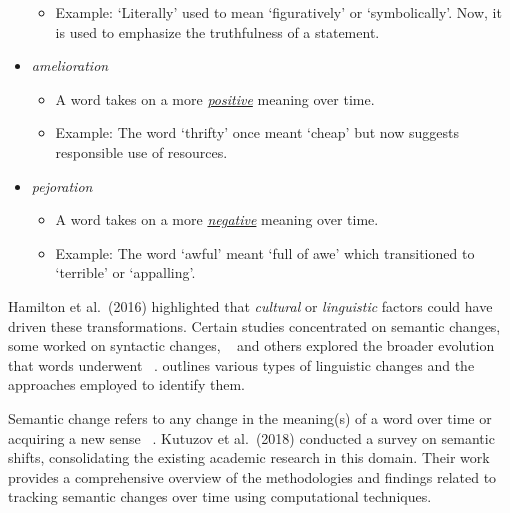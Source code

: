 \begin{itemize}
\begin{itemize}
            \item Example: `Literally' used to mean `figuratively' or `symbolically'.
            Now, it is used to emphasize the truthfulness of a statement.
        \end{itemize}
    \item \emph{amelioration}
     \begin{itemize}
            \item A word takes on a more \underline{\emph{positive}} meaning over time.
            \item Example: The word `thrifty' once meant `cheap' but now suggests responsible use of resources.
        \end{itemize}
    \item \emph{pejoration} ~\cite{10.1162/opmi_a_00081, gulordava-baroni-2011-distributional}
        \begin{itemize}
            \item A word takes on a more \underline{\emph{negative}} meaning over time.
            \item Example: The word `awful' meant `full of awe' which transitioned to `terrible' or `appalling'.
        \end{itemize}

\end{itemize}

Hamilton et al.\ (2016) highlighted that \emph{cultural} or \emph{linguistic} factors could have driven these transformations.
Certain studies concentrated on semantic changes, some worked on syntactic changes, ~\cite{kulkarni2014statisticallysignificantdetectionlinguistic, hamilton-etal-2016-cultural, 10.1162/opmi_a_00081}
and others explored the broader evolution that words underwent ~\cite{gulordava-baroni-2011-distributional, kim-etal-2014-temporal, kulkarni2014statisticallysignificantdetectionlinguistic, hamilton-etal-2016-diachronic}.
 outlines various types of linguistic changes and the approaches employed to identify them.

Semantic change refers to any change in the meaning(s) of a word over time or acquiring a new sense ~\cite{gulordava-baroni-2011-distributional, 10.1162/opmi_a_00081}.
Kutuzov et al.\ (2018) conducted a survey on semantic shifts, consolidating the existing academic research in this domain.
Their work provides a comprehensive overview of the methodologies and findings related to tracking semantic changes over time using computational techniques.

